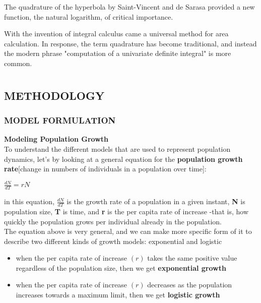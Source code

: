 \documentclass[a4paper,12pt]{report}
\numberwithin{equation}{section}
\begin{document}
The quadrature of the hyperbola by Saint-Vincent and de Sarasa provided a new function, the natural logarithm, of critical importance.

With the invention of integral calculus came a universal method for area calculation. In response, the term quadrature has become traditional, and instead the modern phrase "computation of a univariate definite integral" is more common.









\newpage

\chapter{}
\section{METHODOLOGY}
\subsection{MODEL FORMULATION}
\textbf{Modeling Population Growth}\\
\indent To understand the different models that are used to represent population dynamics, let's by looking at a general equation for the \textbf{population growth rate}[change in numbers of individuals in a population over time]:\\
                
								\begin{center}
								$\frac{dN}{dT}= {rN}$
								\end{center}
\indent in this equation, $\frac{dN}{dT}$ is the growth rate of a population in a given instant, \textbf{N} is population size, \textbf{T} is time, and \textbf{r} is the per capita rate of increase -that is, how quickly the population grows per individual already in the population.\\

\indent The equation above is very general, and we can make more specific form of it to describe two different kinds of growth models: exponential and logistic\\
\begin{itemize}
\item when the per capita rate of increase $(r)$ takes the same positive value regardless of the population size, then we get \textbf{exponential growth}
\item when the per capita rate of increase $(r)$ decreases as the population increases towards a maximum limit, then we get \textbf{logistic growth} 
\end{itemize} 								
\end{document}
